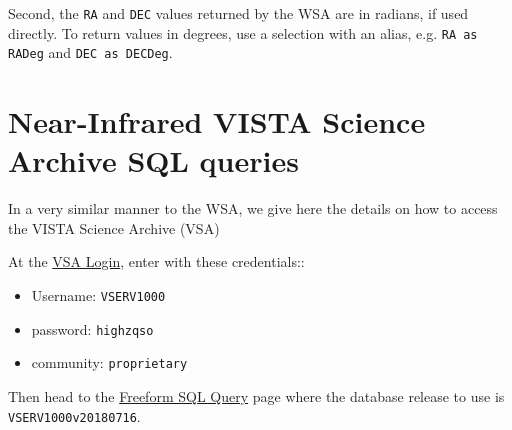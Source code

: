 \documentclass[usenatbib]{mnras}
\begin{document}
Second, the {\tt RA} and {\tt DEC} values returned by the WSA are in radians, if
used directly. To return values in degrees, use a selection with an alias, e.g. 
{\tt RA as RADeg} and {\tt DEC as DECDeg}.

\onecolumn

\twocolumn


\section{Near-Infrared VISTA Science Archive SQL queries}\label{sec:SQL}
In a very similar manner to the WSA, we give here the details on how to access
the VISTA Science Archive (VSA)

At the \href{http://horus.roe.ac.uk/vsa/login.html}{VSA Login}, enter 
with these credentials::
\begin{itemize}
    \item Username: {\tt VSERV1000} 
    \item password: {\tt highzqso} 
    \item community: {\tt proprietary}
\end{itemize}
Then head to the \href{http://horus.roe.ac.uk:8080/vdfs/VSQL_form.jsp}{Freeform SQL Query} page where the database release to use is {\tt VSERV1000v20180716}. 

\onecolumn

\twocolumn










%


\end{document}
